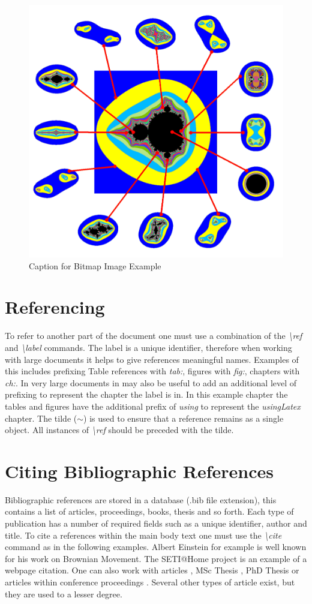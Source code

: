 \begin{figure}[H]
\begin{center}
\includegraphics[width=.34\linewidth]{usingLatex/images/samplepng}
\caption{Caption for Bitmap Image Example} \label{fig:using:samplepngImage}
\end{center}
\end{figure}

\section{Referencing}

To refer to another part of the document one must use a combination of the \emph{\textbackslash ref} and \emph{\textbackslash label} commands. The label is a unique identifier, therefore when working with large documents it helps to give references meaningful names. Examples of this includes prefixing Table references with \emph{tab:}, figures with \emph{fig:}, chapters with \emph{ch:}. In very large documents in may also be useful to add an additional level of prefixing to represent the chapter the label is in. In this example chapter the tables and figures have the additional prefix of \emph{using} to represent the \emph{usingLatex} chapter. The tilde ($\sim$) is used to ensure that a reference remains as a single object. All instances of \emph{\textbackslash ref} should be preceded with the tilde.

\section{Citing Bibliographic References}

Bibliographic references are stored in a database (.bib file extension), this contains a list of articles, proceedings, books, thesis and so forth. Each type of publication has a number of required fields such as a unique identifier, author and title. To cite a references within the main body text one must use the \emph{\textbackslash cite} command as in the following examples.  Albert Einstein \cite{book:einsteinBrownianMovement} for example is well known for his work on Brownian Movement. The SETI@Home project \cite{web:berkeleyBOINC} is an example of a webpage citation. One can also work with articles \cite{art:Moller2003HWRastArch}, MSc Thesis \cite{msc:Edberg2007FluxgateMagnetometer}, PhD Thesis \cite{phd:Grace2004MiddlewareMobile} or articles within conference proceedings \cite{proc:Park2006UIMgtRmtRobots}. Several other types of article exist, but they are used to a lesser degree.

